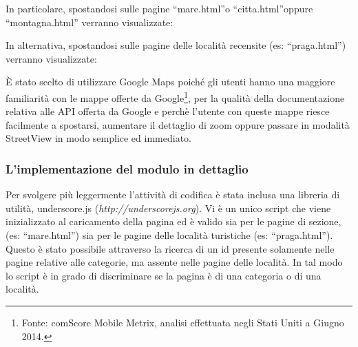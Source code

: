 \begin{flushleft}
In particolare, spostandosi sulle pagine “mare.html”o “citta.html”oppure “montagna.html” verranno visualizzate:
\end{flushleft}
\begin{flushleft}
In alternativa, spostandosi sulle pagine delle località recensite (es: “praga.html”) verranno visualizzate:
\end{flushleft}
È stato scelto di utilizzare Google Maps poiché gli utenti hanno una maggiore
familiarità con le mappe offerte da Google\footnote{ Fonte: comScore Mobile
Metrix, analisi effettuata negli Stati Uniti a Giugno 2014.}, per la qualità
della documentazione relativa alle API offerta da Google e perchè l'utente con
queste mappe riesce facilmente a spostarsi, aumentare il dettaglio di zoom
oppure passare in modalità StreetView in modo semplice ed immediato.

\subsubsection{L'implementazione del modulo in dettaglio}

Per svolgere più leggermente l'attività di codifica è stata inclusa una libreria di utilità, underscore.js (\textit{http://underscorejs.org}).
Vi è un unico script che viene inizializzato al caricamento della pagina ed è valido sia per le pagine di sezione, (es: “mare.html”) sia per le pagine delle località turistiche (es: “praga.html”).
Questo è stato possibile attraverso la ricerca di un id presente solamente nelle pagine relative alle categorie, ma assente nelle pagine delle località. In tal modo lo script è in grado di discriminare se la pagina è di una categoria o di una località.

